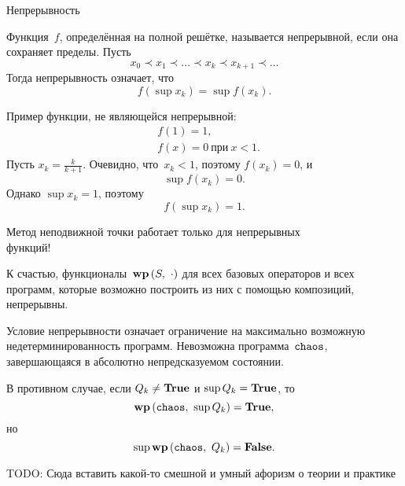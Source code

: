 \documentclass[landscape]{slides}
\begin{document}
\begin{slide}
        Непрерывность

        Функция~$f$, определённая на полной решётке, называется непрерывной, если она сохраняет пределы.
        Пусть
        \[
                x_0\prec x_1\prec\ldots\prec x_k\prec x_{k+1}\prec\ldots
        \]
        Тогда непрерывность означает, что
        \[
                f\left(\sup{x_k}\right) = \sup f\left(x_k\right) .
        \]

        Пример функции, не являющейся непрерывной:
        \begin{eqnarray*}
                &f(1) = 1 ,\\
                &f(x) = 0\ \text{при}\ x<1.
        \end{eqnarray*}
        Пусть $x_k = \frac{k}{k+1}$. Очевидно, что~$x_k < 1$, поэтому $f(x_k) = 0$, и
        \[
                \sup f(x_k) = 0 .
        \]
        Однако $\sup x_k = 1$, поэтому
        \[
                f(\sup x_k) = 1 .
        \]
\end{slide}

\begin{slide}
        Метод неподвижной точки работает только для непрерывных\\функций!

        К счастью, функционалы~$\mathbf{wp}\left({S},\ {\cdot}\right)$ для всех базовых операторов и всех программ,
        которые возможно построить из них с помощью композиций, непрерывны.

        Условие непрерывности означает ограничение на максимально возможную недетерминированность
        программ. Невозможна программа~$\mathtt{chaos}$, завершающаяся в абсолютно непредсказуемом состоянии.

        В противном случае, если $Q_k\ne\mathbf{True}$ и $\sup Q_k = \mathbf{True}$, то
        \[
                \mathbf{wp}\left({\mathtt{chaos}},\ {\sup Q_k}\right) = \mathbf{True},
        \]
        но
        \[
                \sup \mathbf{wp}\left({\mathtt{chaos}},\ {Q_k}\right) = \mathbf{False}.
        \]
\end{slide}

\begin{slide}
    \begin{center}
        \begin{LARGE}
            TODO: Сюда вставить какой-то смешной и умный афоризм о теории и практике
        \end{LARGE}
    \end{center}
\end{slide}
\end{document}
